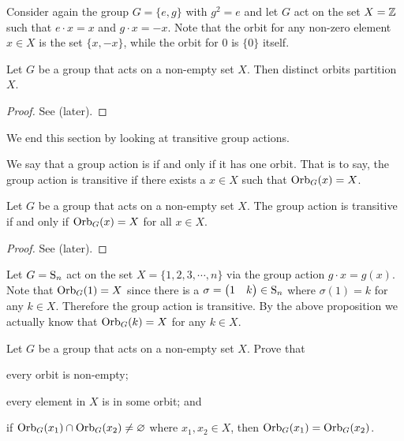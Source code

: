 \begin{example}
    Consider again the group $G = \{e, g\}$ with $g^2 = e$ and let $G$ act on the set $X = \mathbb{Z}$ such that $e \cdot x = x$ and $g \cdot x = -x$. Note that the orbit for any non-zero element $x \in X$ is the set $\{x, -x\}$, while the orbit for 0 is $\{0\}$ itself.
\end{example}

\begin{proposition}\label{prop-distinct-orbits-partition-set}
    Let $G$ be a group that acts on a non-empty set $X$. Then distinct orbits partition $X$.
\end{proposition}
\begin{proof}
    See  (later).
\end{proof}

We end this section by looking at transitive group actions.
\begin{definition}
    We say that a group action is  if and only if it has one orbit. That is to say, the group action is transitive if there exists a $x \in X$ such that $\mathrm{Orb}_{G}(x) = X$.
\end{definition}
\begin{proposition}
    Let $G$ be a group that acts on a non-empty set $X$. The group action is transitive if and only if $\mathrm{Orb}_{G}(x) = X$ for all $x \in X$.
\end{proposition}
\begin{proof}
    See  (later).
\end{proof}

\begin{example}
    Let $G = \mathrm{S}_{n}$ act on the set $X = \{1, 2, 3, \cdots, n\}$ via the group action $g\cdot x = g(x)$. Note that $\mathrm{Orb}_{G}(1) = X$ since there is a $\sigma = \begin{pmatrix}1&k\end{pmatrix} \in \mathrm{S}_{n}$ where $\sigma(1) = k$ for any $k \in X$. Therefore the group action is transitive. By the above proposition we actually know that $\mathrm{Orb}_{G}(k) = X$ for any $k \in X$.
\end{example}

\begin{exercise}\label{exercise-distinct-orbits-partition-set}
    Let $G$ be a group that acts on a non-empty set $X$. Prove that
    \begin{partquestions}{\alph*}
        \item every orbit is non-empty;
        \item every element in $X$ is in some orbit; and
        \item if $\mathrm{Orb}_{G}(x_1) \cap \mathrm{Orb}_{G}(x_2) \neq \varnothing$ where $x_1, x_2 \in X$, then $\mathrm{Orb}_{G}(x_1) = \mathrm{Orb}_{G}(x_2)$.
    \end{partquestions}
\end{exercise}

